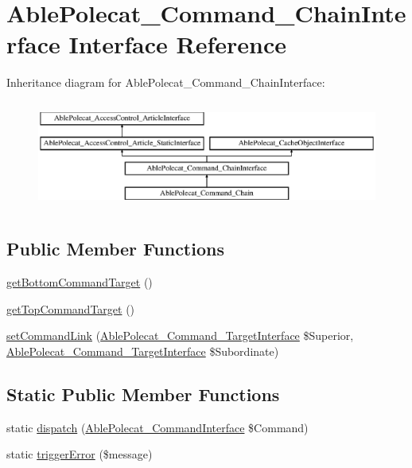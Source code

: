 \hypertarget{interface_able_polecat___command___chain_interface}{}\section{Able\+Polecat\+\_\+\+Command\+\_\+\+Chain\+Interface Interface Reference}
\label{interface_able_polecat___command___chain_interface}
Inheritance diagram for Able\+Polecat\+\_\+\+Command\+\_\+\+Chain\+Interface\+:\begin{figure}[H]
\begin{center}
\leavevmode
\includegraphics[height=3.612903cm]{interface_able_polecat___command___chain_interface}
\end{center}
\end{figure}
\subsection*{Public Member Functions}
\begin{DoxyCompactItemize}
\item 
\hyperlink{interface_able_polecat___command___chain_interface_af7a918af43e7bf03f9b815c0d9cb4ff4}{get\+Bottom\+Command\+Target} ()
\item 
\hyperlink{interface_able_polecat___command___chain_interface_ae62d6679a43700f22fda4d1613a3c2ce}{get\+Top\+Command\+Target} ()
\item 
\hyperlink{interface_able_polecat___command___chain_interface_acb3b9b68b805ffd1619966a5ed7c0a39}{set\+Command\+Link} (\hyperlink{interface_able_polecat___command___target_interface}{Able\+Polecat\+\_\+\+Command\+\_\+\+Target\+Interface} \$Superior, \hyperlink{interface_able_polecat___command___target_interface}{Able\+Polecat\+\_\+\+Command\+\_\+\+Target\+Interface} \$Subordinate)
\end{DoxyCompactItemize}
\subsection*{Static Public Member Functions}
\begin{DoxyCompactItemize}
\item 
static \hyperlink{interface_able_polecat___command___chain_interface_a8c95906f06450a060c5c9f0dc5b64fb5}{dispatch} (\hyperlink{interface_able_polecat___command_interface}{Able\+Polecat\+\_\+\+Command\+Interface} \$Command)
\item 
static \hyperlink{interface_able_polecat___command___chain_interface_ae121fc73d26ff0d391d4cd120f88a820}{trigger\+Error} (\$message)
\end{DoxyCompactItemize}


